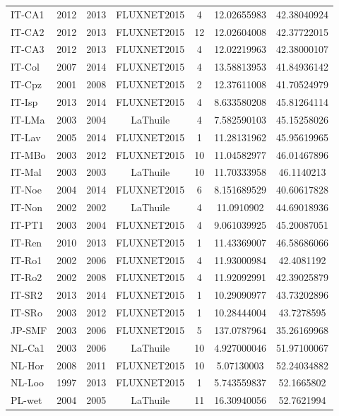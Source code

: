 \begin{center}
\begin{longtable}{lcccccc}
IT-CA1 & 2012 & 2013 & FLUXNET2015 & 4      & 12.02655983  & 42.38040924  \\
IT-CA2 & 2012 & 2013 & FLUXNET2015 & 12     & 12.02604008  & 42.37722015  \\
IT-CA3 & 2012 & 2013 & FLUXNET2015 & 4      & 12.02219963  & 42.38000107  \\
IT-Col & 2007 & 2014 & FLUXNET2015 & 4      & 13.58813953  & 41.84936142  \\
IT-Cpz & 2001 & 2008 & FLUXNET2015 & 2      & 12.37611008  & 41.70524979  \\
IT-Isp & 2013 & 2014 & FLUXNET2015 & 4      & 8.633580208  & 45.81264114  \\
IT-LMa & 2003 & 2004 & LaThuile    & 4      & 7.582590103  & 45.15258026  \\
IT-Lav & 2005 & 2014 & FLUXNET2015 & 1      & 11.28131962  & 45.95619965  \\
IT-MBo & 2003 & 2012 & FLUXNET2015 & 10     & 11.04582977  & 46.01467896  \\
IT-Mal & 2003 & 2003 & LaThuile    & 10     & 11.70333958  & 46.1140213   \\
IT-Noe & 2004 & 2014 & FLUXNET2015 & 6      & 8.151689529  & 40.60617828  \\
IT-Non & 2002 & 2002 & LaThuile    & 4      & 11.0910902   & 44.69018936  \\
IT-PT1 & 2003 & 2004 & FLUXNET2015 & 4      & 9.061039925  & 45.20087051  \\
IT-Ren & 2010 & 2013 & FLUXNET2015 & 1      & 11.43369007  & 46.58686066  \\
IT-Ro1 & 2002 & 2006 & FLUXNET2015 & 4      & 11.93000984  & 42.4081192   \\
IT-Ro2 & 2002 & 2008 & FLUXNET2015 & 4      & 11.92092991  & 42.39025879  \\
IT-SR2 & 2013 & 2014 & FLUXNET2015 & 1      & 10.29090977  & 43.73202896  \\
IT-SRo & 2003 & 2012 & FLUXNET2015 & 1      & 10.28444004  & 43.7278595   \\
JP-SMF & 2003 & 2006 & FLUXNET2015 & 5      & 137.0787964  & 35.26169968  \\
NL-Ca1 & 2003 & 2006 & LaThuile    & 10     & 4.927000046  & 51.97100067  \\
NL-Hor & 2008 & 2011 & FLUXNET2015 & 10     & 5.07130003   & 52.24034882  \\
NL-Loo & 1997 & 2013 & FLUXNET2015 & 1      & 5.743559837  & 52.1665802   \\
PL-wet & 2004 & 2005 & LaThuile    & 11     & 16.30940056  & 52.7621994   \\

\end{longtable}
\end{center}
